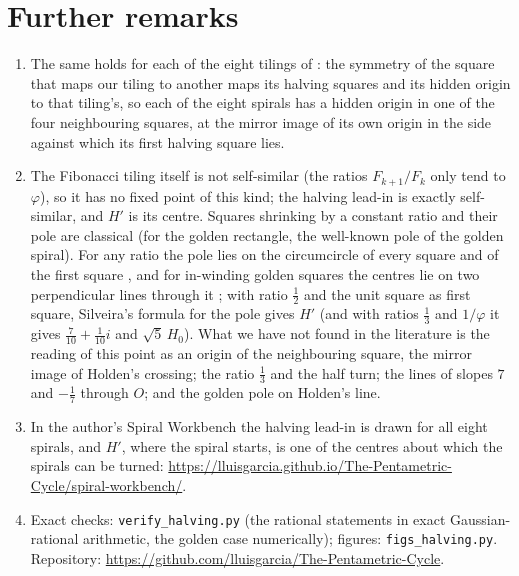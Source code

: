 \documentclass[11pt,a4paper]{article}
\theoremstyle{plain}
\theoremstyle{definition}
\theoremstyle{remark}
\begin{document}
\section{Further remarks}

\begin{enumerate}[leftmargin=*,itemsep=0pt,topsep=2pt]
\item The same holds for each of the eight tilings of \cite{origins}: the symmetry of the square that maps our tiling to another maps its halving squares and its hidden origin to that tiling's, so each of the eight spirals has a hidden origin in one of the four neighbouring squares, at the mirror image of its own origin in the side against which its first halving square lies.
\item The Fibonacci tiling itself is not self-similar (the ratios $F_{k+1}/F_k$ only tend to $\varphi$), so it has no fixed point of this kind; the halving lead-in is exactly self-similar, and $H'$ is its centre. Squares shrinking by a constant ratio and their pole are classical (for the golden rectangle, the well-known pole of the golden spiral). For any ratio the pole lies on the circumcircle of every square and of the first square \cite{silveira}, and for in-winding golden squares the centres lie on two perpendicular lines through it \cite{hoggatt}; with ratio $\tfrac12$ and the unit square as first square, Silveira's formula for the pole \cite[Thm.~2.3]{silveira} gives $H'$ (and with ratios $\tfrac13$ and $1/\varphi$ it gives $\tfrac7{10}+\tfrac1{10}i$ and $\sqrt5\,H_0$). What we have not found in the literature is the reading of this point as an origin of the neighbouring square, the mirror image of Holden's crossing; the ratio $\tfrac13$ and the half turn; the lines of slopes $7$ and $-\tfrac17$ through $O$; and the golden pole on Holden's line.
\item In the author's Spiral Workbench the halving lead-in is drawn for all eight spirals, and $H'$, where the spiral starts, is one of the centres about which the spirals can be turned: \url{https://lluisgarcia.github.io/The-Pentametric-Cycle/spiral-workbench/}.
\item Exact checks: \texttt{verify\_halving.py} (the rational statements in exact Gaussian-rational arithmetic, the golden case numerically); figures: \texttt{figs\_halving.py}. Repository: \url{https://github.com/lluisgarcia/The-Pentametric-Cycle}.
\end{enumerate}
\end{document}
